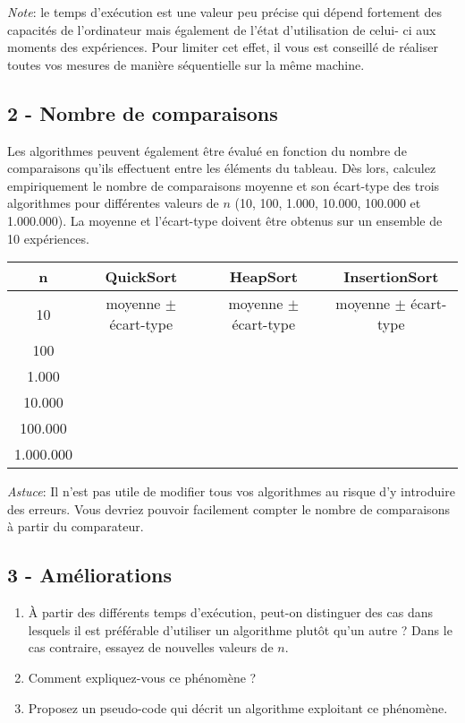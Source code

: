 \documentclass[a4paper,10pt]{article}
\begin{document}
{\em Note}: le temps d'exécution est une valeur peu précise qui dépend fortement
des capacités de l'ordinateur mais également de l'état d'utilisation de celui-
ci aux moments des expériences. Pour limiter cet effet, il vous est conseillé
de réaliser toutes vos mesures de manière séquentielle sur la même machine.

\subsection*{2 - Nombre de comparaisons}

Les algorithmes peuvent également être évalué en fonction du nombre de
comparaisons qu'ils effectuent entre les éléments du tableau. Dès lors, calculez
empiriquement le nombre de comparaisons moyenne et son écart-type des trois
algorithmes pour différentes valeurs de $n$ (10, 100, 1.000, 10.000, 100.000 et
1.000.000). La moyenne et l'écart-type doivent être obtenus sur un ensemble de
10 expériences.

\begin{center}
\begin{tabular}{cccc}
	\hline
	n & QuickSort & HeapSort & InsertionSort \\
	\hline
	10 & moyenne $\pm$ écart-type & moyenne $\pm$ écart-type & moyenne $\pm$ écart-type\\
	100 & & &\\
	1.000 & & &\\
	10.000 & & &\\
	100.000 & & &\\
	1.000.000 & & &\\
\end{tabular}
\end{center}

{\em Astuce}: Il n'est pas utile de modifier tous vos algorithmes au risque d'y
introduire des erreurs. Vous devriez pouvoir facilement compter le nombre de
comparaisons à partir du comparateur.

\subsection*{3 - Améliorations}
\begin{enumerate}
\item À partir des différents temps d'exécution, peut-on distinguer des cas dans lesquels il est préférable d'utiliser un algorithme plutôt qu'un autre ? Dans le cas contraire, essayez de nouvelles valeurs de $n$.
\item Comment expliquez-vous ce phénomène ?
\item Proposez un pseudo-code qui décrit un algorithme exploitant ce phénomène.
\end{enumerate}
\end{document}
